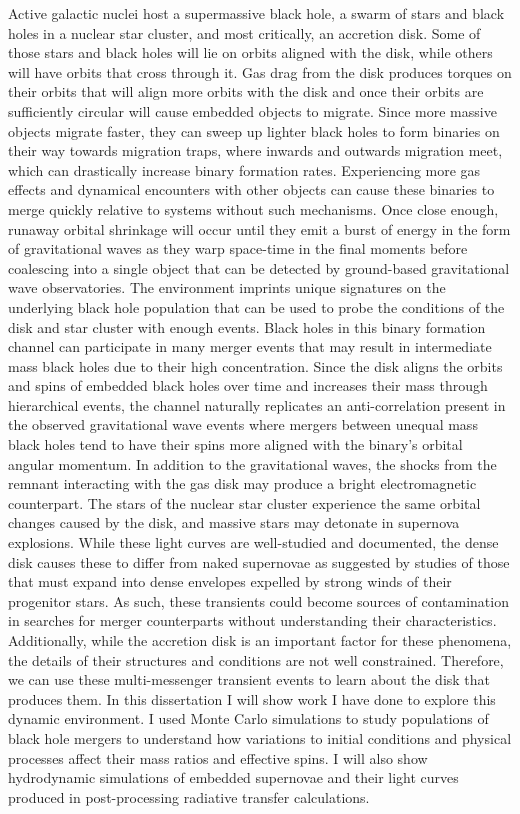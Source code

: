 Active galactic nuclei host a supermassive black hole, a swarm of stars and black holes in a nuclear star cluster, and most critically, an accretion disk.
Some of those stars and black holes will lie on orbits aligned with the disk, while others will have orbits that cross through it.
Gas drag from the disk produces torques on their orbits that will align more orbits with the disk and once their orbits are sufficiently circular will cause embedded objects to migrate.
Since more massive objects migrate faster, they can sweep up lighter black holes to form binaries on their way towards migration traps, where inwards and outwards migration meet, which can drastically increase binary formation rates.
Experiencing more gas effects and dynamical encounters with other objects can cause these binaries to merge quickly relative to systems without such mechanisms.
Once close enough, runaway orbital shrinkage will occur until they emit a burst of energy in the form of gravitational waves as they warp space-time in the final moments before coalescing into a single object that can be detected by ground-based gravitational wave observatories.
The environment imprints unique signatures on the underlying black hole population that can be used to probe the conditions of the disk and star cluster with enough events.
Black holes in this binary formation channel can participate in many merger events that may result in intermediate mass black holes due to their high concentration.
Since the disk aligns the orbits and spins of embedded black holes over time and increases their mass through hierarchical events, the channel naturally replicates an anti-correlation present in the observed gravitational wave events where mergers between unequal mass black holes tend to have their spins more aligned with the binary's orbital angular momentum.
In addition to the gravitational waves, the shocks from the remnant interacting with the gas disk may produce a bright electromagnetic counterpart.
The stars of the nuclear star cluster experience the same orbital changes caused by the disk, and massive stars may detonate in supernova explosions.
While these light curves are well-studied and documented, the dense disk causes these to differ from naked supernovae as suggested by studies of those that must expand into dense envelopes expelled by strong winds of their progenitor stars.
As such, these transients could become sources of contamination in searches for merger counterparts without understanding their characteristics.
Additionally, while the accretion disk is an important factor for these phenomena, the details of their structures and conditions are not well constrained.
Therefore, we can use these multi-messenger transient events to learn about the disk that produces them.
In this dissertation I will show work I have done to explore this dynamic environment.
I used Monte Carlo simulations to study populations of black hole mergers to understand how variations to initial conditions and physical processes affect their mass ratios and effective spins.
I will also show hydrodynamic simulations of embedded supernovae and their light curves produced in post-processing radiative transfer calculations.

